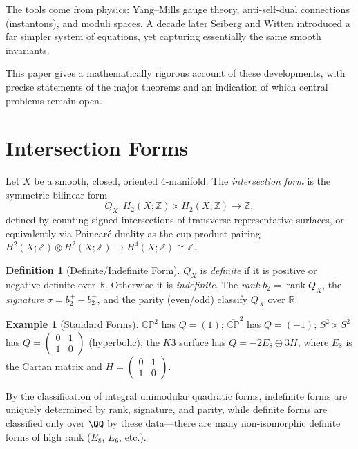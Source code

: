 \documentclass[12pt,a4paper]{amsart}
\theoremstyle{definition}
\newtheorem{definition}[theorem]{Definition}
\newtheorem{example}[theorem]{Example}
\theoremstyle{remark}
\DeclareMathOperator{\rank}{rank}
\newcommand{\CP}{\mathbb{CP}}
\newcommand{\ZZ}{\mathbb{Z}}
\newcommand{\RR}{\mathbb{R}}
\begin{document}
The tools come from physics: Yang--Mills gauge theory, anti-self-dual
connections (instantons), and moduli spaces.  A decade later Seiberg and
Witten \cite{SeibergWitten1994} introduced a far simpler system of
equations, yet capturing essentially the same smooth invariants.

This paper gives a mathematically rigorous account of these developments,
with precise statements of the major theorems and an indication of which
central problems remain open.

\section{Intersection Forms}

Let $X$ be a smooth, closed, oriented 4-manifold.  The \emph{intersection
form} is the symmetric bilinear form
\[
  Q_X \colon H_2(X;\ZZ) \times H_2(X;\ZZ) \longrightarrow \ZZ,
\]
defined by counting signed intersections of transverse representative
surfaces, or equivalently via Poincaré duality as the cup product pairing
$H^2(X;\ZZ) \otimes H^2(X;\ZZ) \to H^4(X;\ZZ) \cong \ZZ$.

\begin{definition}[Definite/Indefinite Form]
$Q_X$ is \emph{definite} if it is positive or negative definite over $\RR$.
Otherwise it is \emph{indefinite}.  The \emph{rank} $b_2 = \rank Q_X$,
the \emph{signature} $\sigma = b_2^+ - b_2^-$, and the parity (even/odd)
classify $Q_X$ over $\RR$.
\end{definition}

\begin{example}[Standard Forms]
$\CP^2$ has $Q = (1)$; $\overline{\CP}^2$ has $Q = (-1)$;
$S^2 \times S^2$ has $Q = \begin{pmatrix}0&1\\1&0\end{pmatrix}$ (hyperbolic);
the $K3$ surface has $Q = -2E_8 \oplus 3H$, where $E_8$ is the Cartan matrix
and $H = \begin{pmatrix}0&1\\1&0\end{pmatrix}$.
\end{example}

By the classification of integral unimodular quadratic forms, indefinite
forms are uniquely determined by rank, signature, and parity, while
definite forms are classified only over $\QQ$ by these data---there are
many non-isomorphic definite forms of high rank ($E_8$, $E_6$, etc.).
\end{document}
